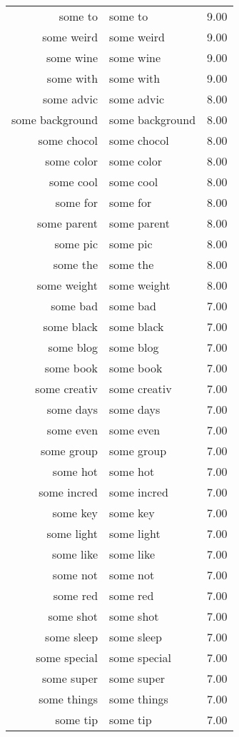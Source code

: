 \begin{table}[ht]
\begin{tabular}{rlr}
  some to & some to & 9.00 \\ 
  some weird & some weird & 9.00 \\ 
  some wine & some wine & 9.00 \\ 
  some with & some with & 9.00 \\ 
  some advic & some advic & 8.00 \\ 
  some background & some background & 8.00 \\ 
  some chocol & some chocol & 8.00 \\ 
  some color & some color & 8.00 \\ 
  some cool & some cool & 8.00 \\ 
  some for & some for & 8.00 \\ 
  some parent & some parent & 8.00 \\ 
  some pic & some pic & 8.00 \\ 
  some the & some the & 8.00 \\ 
  some weight & some weight & 8.00 \\ 
  some bad & some bad & 7.00 \\ 
  some black & some black & 7.00 \\ 
  some blog & some blog & 7.00 \\ 
  some book & some book & 7.00 \\ 
  some creativ & some creativ & 7.00 \\ 
  some days & some days & 7.00 \\ 
  some even & some even & 7.00 \\ 
  some group & some group & 7.00 \\ 
  some hot & some hot & 7.00 \\ 
  some incred & some incred & 7.00 \\ 
  some key & some key & 7.00 \\ 
  some light & some light & 7.00 \\ 
  some like & some like & 7.00 \\ 
  some not & some not & 7.00 \\ 
  some red & some red & 7.00 \\ 
  some shot & some shot & 7.00 \\ 
  some sleep & some sleep & 7.00 \\ 
  some special & some special & 7.00 \\ 
  some super & some super & 7.00 \\ 
  some things & some things & 7.00 \\ 
  some tip & some tip & 7.00 \\ 

\end{tabular}
\end{table}

